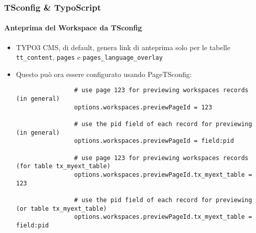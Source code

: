 \begin{frame}[fragile]
	\frametitle{TSconfig \& TypoScript}
	\framesubtitle{Anteprima del Workspace da TSconfig}

	\lstset{basicstyle=\tiny\ttfamily}

	\begin{itemize}

		\item TYPO3 CMS, di default, genera link di anteprima solo per le tabelle \texttt{tt\_content}, \texttt{pages} e
			\texttt{pages\_language\_overlay}

		\item Questo può ora essere configurato usando PageTSconfig:

			\begin{lstlisting}
				# use page 123 for previewing workspaces records (in general)
				options.workspaces.previewPageId = 123

				# use the pid field of each record for previewing (in general)
				options.workspaces.previewPageId = field:pid

				# use page 123 for previewing workspaces records (for table tx_myext_table)
				options.workspaces.previewPageId.tx_myext_table = 123

				# use the pid field of each record for previewing (or table tx_myext_table)
				options.workspaces.previewPageId.tx_myext_table = field:pid
			\end{lstlisting}

	\end{itemize}

\end{frame}

